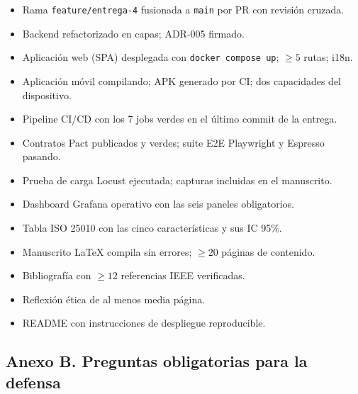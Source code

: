 \documentclass[11pt,a4paper]{article}
\begin{document}
    \begin{itemize}
        \item[$\square$] Rama \texttt{feature/entrega-4} fusionada a \texttt{main} por PR con revisión cruzada.
        \item[$\square$] Backend refactorizado en capas; ADR-005 firmado.
        \item[$\square$] Aplicación web (SPA) desplegada con \texttt{docker compose up}; $\ge 5$ rutas; i18n.
        \item[$\square$] Aplicación móvil compilando; APK generado por CI; dos capacidades del dispositivo.
        \item[$\square$] Pipeline CI/CD con los 7 jobs verdes en el último commit de la entrega.
        \item[$\square$] Contratos Pact publicados y verdes; suite E2E Playwright y Espresso pasando.
        \item[$\square$] Prueba de carga Locust ejecutada; capturas incluidas en el manuscrito.
        \item[$\square$] Dashboard Grafana operativo con las seis paneles obligatorios.
        \item[$\square$] Tabla ISO 25010 con las cinco características y sus IC 95\%.
        \item[$\square$] Manuscrito LaTeX compila sin errores; $\ge 20$ páginas de contenido.
        \item[$\square$] Bibliografía con $\ge 12$ referencias IEEE verificadas.
        \item[$\square$] Reflexión ética de al menos media página.
        \item[$\square$] README con instrucciones de despliegue reproducible.
    \end{itemize}

\subsection*{Anexo B. Preguntas obligatorias para la defensa}
\end{document}
